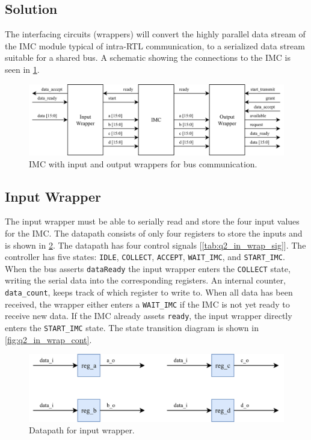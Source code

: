 \documentclass[../main.tex]{subfiles}
\begin{document}
\subsection*{Solution}

The interfacing circuits (wrappers) will convert the highly parallel data stream of the IMC module typical of intra-RTL communication, to a serialized data stream suitable for a shared bus. A schematic showing the connections to the IMC is seen in \cref{fig:q2_wrap}.

\begin{figure}[h]
    \centering
    \includegraphics[width=\linewidth]{assets/q2.png}
    \caption{IMC with input and output wrappers for bus communication.}
    \label{fig:q2_wrap}
\end{figure}

\newpage

\subsection*{Input Wrapper}

The input wrapper must be able to serially read and store the four input values for the IMC. The datapath consists of only four registers to store the inputs and is shown in \cref{fig:q2_in_wrap_dp}. The datapath has four control signals [\cref{tab:q2_in_wrap_sig}]. The controller has five states: \texttt{IDLE}, \texttt{COLLECT}, \texttt{ACCEPT}, \texttt{WAIT\_IMC}, and \texttt{START\_IMC}. When the bus asserts \texttt{dataReady} the input wrapper enters the \texttt{COLLECT} state, writing the serial data into the corresponding registers. An internal counter, \texttt{data\_count}, keeps track of which register to write to. When all data has been received, the wrapper either enters a \texttt{WAIT\_IMC} if the IMC is not yet ready to receive new data. If the IMC already assets \texttt{ready}, the input wrapper directly enters the \texttt{START\_IMC} state. The state transition diagram is shown in \cref{fig:q2_in_wrap_cont}.

\begin{figure}[h]
    \centering
    \includegraphics[width=\linewidth]{assets/in_wrap_dp.png}
    \caption{Datapath for input wrapper.}
    \label{fig:q2_in_wrap_dp}
\end{figure}
\end{document}
